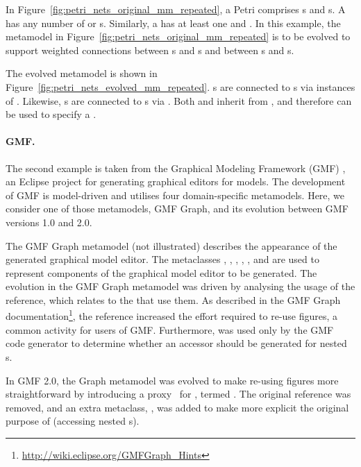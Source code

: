 In Figure~\ref{fig:petri_nets_original_mm_repeated}, a Petri  comprises s and s. A  has any number of  or  s. Similarly, a  has at least one  and  . In this example, the metamodel in Figure~\ref{fig:petri_nets_original_mm_repeated} is to be evolved to support weighted connections between s and s and between s and s.

The evolved metamodel is shown in Figure~\ref{fig:petri_nets_evolved_mm_repeated}. s are connected to s via instances of . Likewise, s are connected to s via . Both  and  inherit from , and therefore can be used to specify a .

\paragraph{GMF.}
The second example is taken from the Graphical Modeling Framework (GMF) \cite{gronback09emp}, an Eclipse project for generating graphical editors for models. The development of GMF is model-driven and utilises four domain-specific metamodels. Here, we consider one of those metamodels, GMF Graph, and its evolution between GMF versions 1.0 and 2.0. 

The GMF Graph metamodel (not illustrated) describes the appearance of the generated graphical model editor. The metaclasses , , , , , and  are used to represent components of the graphical model editor to be generated. The evolution in the GMF Graph metamodel was driven by analysing the usage of the  reference, which relates  to the  that use them. As described in the GMF Graph documentation\footnote{\url{http://wiki.eclipse.org/GMFGraph_Hints}}, the  reference increased the effort required to re-use figures, a common activity for users of GMF. Furthermore,  was used only by the GMF code generator to determine whether an accessor
should be generated for nested s.

In GMF 2.0, the Graph metamodel was evolved to make re-using figures more straightforward by introducing a proxy~\cite{gamma95patterns} for , termed . The original  reference was removed, and an extra metaclass, , was added to make more explicit the original purpose of  (accessing nested s).

